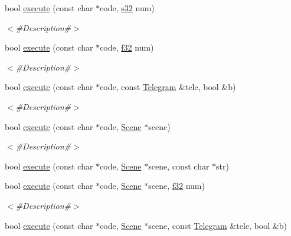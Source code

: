 \begin{DoxyCompactItemize}
bool \mbox{\hyperlink{classnjli_1_1_world_lua_virtual_machine_a1e20adef1ec977bc52e3343320ac7ff6}{execute}} (const char $\ast$code, \mbox{\hyperlink{_util_8h_aa62c75d314a0d1f37f79c4b73b2292e2}{s32}} num)
\begin{DoxyCompactList}\small\item\em $<$\#\+Description\#$>$ \end{DoxyCompactList}\item 
bool \mbox{\hyperlink{classnjli_1_1_world_lua_virtual_machine_a8e4cfb46cfc326f39c95f87abf1ed570}{execute}} (const char $\ast$code, \mbox{\hyperlink{_util_8h_a5f6906312a689f27d70e9d086649d3fd}{f32}} num)
\begin{DoxyCompactList}\small\item\em $<$\#\+Description\#$>$ \end{DoxyCompactList}\item 
bool \mbox{\hyperlink{classnjli_1_1_world_lua_virtual_machine_a063c843476fae634bfa3b37341bf6bc7}{execute}} (const char $\ast$code, const \mbox{\hyperlink{classnjli_1_1_telegram}{Telegram}} \&tele, bool \&b)
\begin{DoxyCompactList}\small\item\em $<$\#\+Description\#$>$ \end{DoxyCompactList}\item 
bool \mbox{\hyperlink{classnjli_1_1_world_lua_virtual_machine_a2bf26f519cdd10cded878aeb2bdf1f98}{execute}} (const char $\ast$code, \mbox{\hyperlink{classnjli_1_1_scene}{Scene}} $\ast$scene)
\begin{DoxyCompactList}\small\item\em $<$\#\+Description\#$>$ \end{DoxyCompactList}\item 
bool \mbox{\hyperlink{classnjli_1_1_world_lua_virtual_machine_af9efd06a3f45642e82f7f5089518a4d1}{execute}} (const char $\ast$code, \mbox{\hyperlink{classnjli_1_1_scene}{Scene}} $\ast$scene, const char $\ast$str)
\item 
bool \mbox{\hyperlink{classnjli_1_1_world_lua_virtual_machine_a6fa89f17cc97432e1bbbad2a94d93eb8}{execute}} (const char $\ast$code, \mbox{\hyperlink{classnjli_1_1_scene}{Scene}} $\ast$scene, \mbox{\hyperlink{_util_8h_a5f6906312a689f27d70e9d086649d3fd}{f32}} num)
\begin{DoxyCompactList}\small\item\em $<$\#\+Description\#$>$ \end{DoxyCompactList}\item 
bool \mbox{\hyperlink{classnjli_1_1_world_lua_virtual_machine_a5f84df3f3b820cf49bd362285adb5d7c}{execute}} (const char $\ast$code, \mbox{\hyperlink{classnjli_1_1_scene}{Scene}} $\ast$scene, const \mbox{\hyperlink{classnjli_1_1_telegram}{Telegram}} \&tele, bool \&b)

\end{DoxyCompactItemize}
